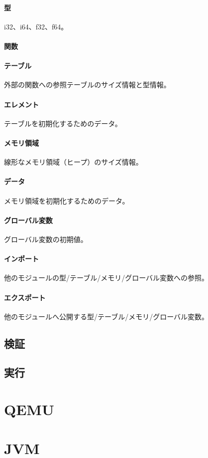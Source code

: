 \paragraph{型}

i32、i64、f32、f64。

\paragraph{関数}

\paragraph{テーブル}

外部の関数への参照テーブルのサイズ情報と型情報。

\paragraph{エレメント}

テーブルを初期化するためのデータ。

\paragraph{メモリ領域}

線形なメモリ領域（ヒープ）のサイズ情報。

\paragraph{データ}

メモリ領域を初期化するためのデータ。

\paragraph{グローバル変数}

グローバル変数の初期値。

\paragraph{インポート}

他のモジュールの型/テーブル/メモリ/グローバル変数への参照。

\paragraph{エクスポート}

他のモジュールへ公開する型/テーブル/メモリ/グローバル変数。

\subsection{検証}

\subsection{実行}

\section{QEMU}

\section{JVM}
